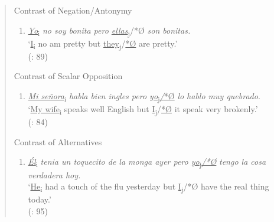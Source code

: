 \documentclass[
  letterpaper,
  DIV=11,
  numbers=noendperiod]{scrartcl}
\providecommand{\tightlist}{%
  \setlength{\itemsep}{0pt}\setlength{\parskip}{0pt}}
\begin{document}
\begin{quote}
Contrast of Negation/Antonymy

\begin{enumerate}
\def\labelenumi{\arabic{enumi}.}
\setcounter{enumi}{18}
\tightlist
\item
  \ul{\emph{Yo}}\textsubscript{i} \emph{no soy bonita pero
  \ul{ellas}}\textsubscript{j}/*Ø \emph{son bonitas.}\\
  `\ul{I}\textsubscript{i} no am pretty but
  \ul{they}\textsubscript{j}/\ul{*Ø} are pretty.'\\
  (: 89)
\end{enumerate}

Contrast of Scalar Opposition

\begin{enumerate}
\def\labelenumi{\arabic{enumi}.}
\setcounter{enumi}{19}
\tightlist
\item
  \ul{\emph{Mi señora}}\textsubscript{i} \emph{habla bien ingles pero
  \ul{yo}}\textsubscript{j}\ul{\emph{/}*Ø} \emph{lo hablo muy
  quebrado}.\\
  `\ul{My wife}\textsubscript{i} speaks well English but
  \ul{I}\textsubscript{j}/\ul{*Ø} it speak very brokenly.'\\
  (: 84)
\end{enumerate}

Contrast of Alternatives

\begin{enumerate}
\def\labelenumi{\arabic{enumi}.}
\setcounter{enumi}{20}
\tightlist
\item
  \ul{\emph{Él}}\textsubscript{i} \emph{tenia un toquecito de la monga
  ayer pero \ul{yo}}\textsubscript{j}\ul{\emph{/*Ø}} \emph{tengo la cosa
  verdadera hoy.}\\
  `\ul{He}\textsubscript{i} had a touch of the flu yesterday but
  \ul{I}\textsubscript{j}/*Ø have the real thing today.'\\
  (: 95)
\end{enumerate}
\end{quote}
\end{document}
